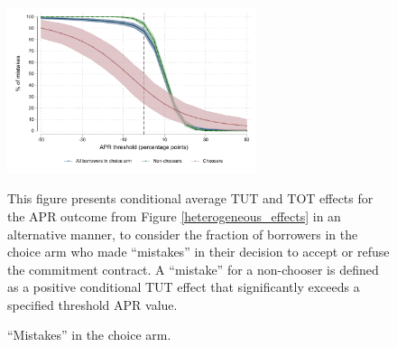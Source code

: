 \documentclass[12pt, a4paper]{article}
\begin{document}
\vspace{.2in}
\begin{figure}[H]
 \caption{``Mistakes'' in the choice arm.}
\begin{center}
        \centering
        \includegraphics[width=0.65\textwidth]{Figuras/line_cw_apr_tot_tut.pdf}
 \end{center}       
 \scriptsize{This figure presents conditional average TUT and TOT effects for the APR outcome from Figure \ref{heterogeneous_effects} in an alternative manner, to consider the fraction of borrowers in the choice arm who made ``mistakes'' in their decision to accept or refuse the commitment contract. A ``mistake'' for a non-chooser is defined as a positive conditional TUT effect that significantly exceeds a specified threshold APR value.
 
}
    \label{choose_wrong}
\end{figure}
\end{document}
